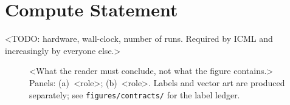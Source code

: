 \documentclass[10pt]{article}
\begin{document}
\section*{Compute Statement}
<TODO: hardware, wall-clock, number of runs. Required by ICML and increasingly by
everyone else.>

%
\begin{figure}[t]
  \centering
  \csffigplaceholder{4.2cm}
  \caption{<What the reader must conclude, not what the figure contains.>
    Panels: (a)~<role>; (b)~<role>. Labels and vector art are produced separately;
    see \texttt{figures/contracts/} for the label ledger.}
  \label{fig:main}
\end{figure}


\end{document}
